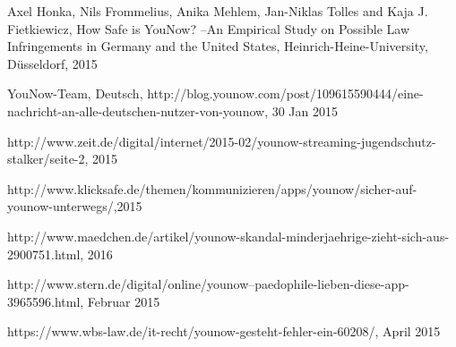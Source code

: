 %
%

\begin{thebibliography}{12cm}

 Axel Honka, Nils Frommelius, Anika Mehlem, Jan-Niklas Tolles and Kaja J. Fietkiewicz,    How Safe is YouNow? –An Empirical Study on Possible Law Infringements in Germany and the United States, Heinrich-Heine-University, Düsseldorf, 2015
   
 YouNow-Team, Deutsch, http://blog.younow.com/post/109615590444/eine-nachricht-an-alle-deutschen-nutzer-von-younow, 30 Jan 2015

 http://www.zeit.de/digital/internet/2015-02/younow-streaming-jugendschutz-stalker/seite-2, 2015

 http://www.klicksafe.de/themen/kommunizieren/apps/younow/sicher-auf-younow-unterwegs/,2015

 http://www.maedchen.de/artikel/younow-skandal-minderjaehrige-zieht-sich-aus-2900751.html, 2016

 http://www.stern.de/digital/online/younow--paedophile-lieben-diese-app-3965596.html, Februar 2015

 https://www.wbs-law.de/it-recht/younow-gesteht-fehler-ein-60208/, April 2015
\end{thebibliography}